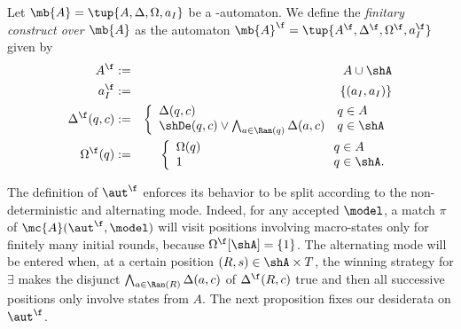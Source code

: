 \begin{definition}\label{def:finitaryconstruct}
Let $\mb{A} = \tup{A,\Delta,\Omega,a_I}$ be a {\wmso-automaton}. We define the \emph{finitary construct over $\mb{A}$} as the automaton $\mb{A}^{\f} = \tup{A^{\f},\Delta^{\f},\Omega^{\f},a_I^{\f}}$ given by %
\begin{eqnarray*}
        A^{\f} &:=& A \cup \shA \\
        a_I^{\f} &:=& \{(a_I,a_I)\}\\
        \Delta^{\f}(q,c) &:=& \left\{
	\begin{array}{ll}
        \Delta(q,c) & q\in A \\
		\shDe(q,c) \vee \bigwedge_{a \in \Ran(q)} \Delta(a,c) & q \in \shA
	\end{array}
\right.\\
        \Omega^{\f}(q) &:=& \left\{
	\begin{array}{ll}
        \Omega(q) & \hspace{3.43cm} q\in A \\
		1 & \hspace{3.43cm} q \in \shA.
	\end{array}
\right.
\end{eqnarray*}%
\end{definition}
The definition of $\aut^{\f}$ enforces its behavior to be split according to the non-deterministic and alternating mode. Indeed, for any accepted $\model$, a match $\pi$ of $\mc{A}(\aut^{\f},\model)$ will visit positions involving macro-states only for finitely many initial rounds, because $\Omega^{\f}[\shA] = \{1\}$. The alternating mode will be entered when, at a certain position $(R,s)\in \shA \times T$, the winning strategy for $\exists$ makes the disjunct $\bigwedge_{a \in \Ran(R)} \Delta(a,c)$ of $\Delta^{\f}(R,c)$ true and then all successive positions only involve states from $A$. The next proposition fixes our desiderata on $\aut^{\f}$.

